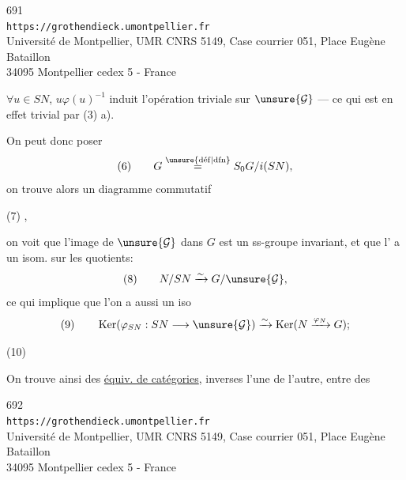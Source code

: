 
\begin{center}
691\\
\texttt{https://grothendieck.umontpellier.fr}\\
Université de Montpellier, UMR CNRS 5149, Case courrier 051, Place Eugène Bataillon\\
34095 Montpellier cedex 5 - France
\end{center}



$\forall u\in SN$, $u\varphi(u)^{-1}$ induit l'opération triviale sur $\unsure{\mathcal G}$ --- ce qui est en effet trivial par (3) a).

On peut donc poser
\[
(6)\qquad  G\overset{\unsure{\mathrm{d\acute ef}|\mathrm{dfn}}}{=}S_0G/i(SN),
\]
on trouve alors un diagramme commutatif

\noindent (7)\quad
{},

on voit que l'image de $\unsure{\mathcal G}$ dans $G$ est un ss-groupe invariant, et que l' a un isom. sur les quotients:
\[
(8)\qquad  N/SN\xrightarrow{\sim}G/\unsure{\mathcal G},
\]
ce qui implique que l'on a aussi un iso
\[
(9)\qquad  \operatorname{Ker}(\varphi_{SN}:SN\longrightarrow\unsure{\mathcal G})
\xrightarrow{\sim}\operatorname{Ker}(N\xrightarrow{\varphi_N}G);
\]

\noindent (10)\quad
{}

On trouve ainsi des \uline{équiv. de catégories}, inverses l'une de l'autre, entre  des


\begin{center}
692\\
\texttt{https://grothendieck.umontpellier.fr}\\
Université de Montpellier, UMR CNRS 5149, Case courrier 051, Place Eugène Bataillon\\
34095 Montpellier cedex 5 - France
\end{center}


